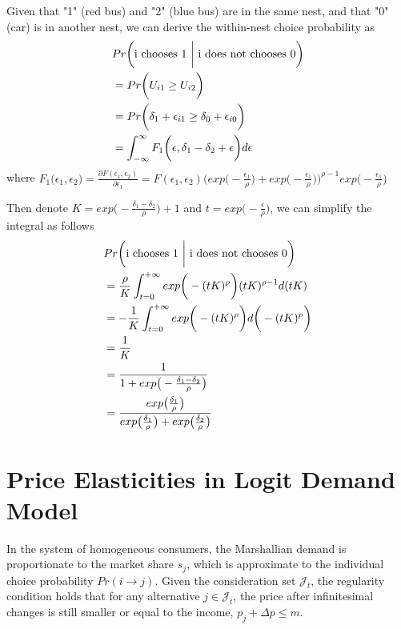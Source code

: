 \documentclass{article}
\begin{document}
Given that "1" (red bus) and "2" (blue bus) are in the same nest, and that "0" (car) is in another nest, we can derive the within-nest choice probability as 
\begin{equation}
\begin{split}
& Pr\bigg(\text{i chooses 1 \bigg| i does not chooses 0}\bigg) \\
& = Pr\bigg( U_{i1} \geq U_{i2} \bigg) \\
& = Pr\bigg(\delta_1 + \epsilon_{i1} \geq \delta_0 + \epsilon_{i0} \bigg) \\
& = \int_{-\infty}^{\infty} F_1\bigg( \epsilon, \delta_1 - \delta_2 + \epsilon \bigg) d\epsilon
\end{split}
\end{equation}
where $F_1\bigg( \epsilon_1, \epsilon_2 \bigg) = \frac{\partial F(\epsilon_1, \epsilon_2)}{\partial \epsilon_1} = F(\epsilon_1, \epsilon_2) \bigg( exp\big( -\frac{\epsilon_1}{\rho} \big) + exp\big( -\frac{\epsilon_1}{\rho} \big) \bigg)^{\rho -1} exp\bigg( -\frac{\epsilon_1}{\rho} \bigg) $

Then denote $K = exp\big( -\frac{\delta_1 - \delta_2}{\rho} \big) + 1$ and $t = exp\big( -\frac{\epsilon}{\rho} \big)$, we can simplify the integral as follows
\begin{equation}
\begin{split}
& Pr\bigg(\text{i chooses 1 \bigg| i does not chooses 0}\bigg) \\
& = \frac{\rho}{K} \int_{t = 0}^{+\infty} exp\bigg( -(tK)^{\rho} \bigg) (tK)^{\rho - 1} d(tK) \\
& = -\frac{1}{K} \int_{t = 0}^{+\infty} exp\bigg( -(tK)^{\rho} \bigg)  d\bigg( -(tK)^{\rho} \bigg) \\
& = \frac{1}{K} \\
& = \frac{1}{1 + exp\big( -\frac{\delta_1 - \delta_2}{\rho} \big) } \\
& = \frac{ exp\big( \frac{\delta_1}{\rho} \big) }{  exp\big( \frac{\delta_1}{\rho} \big) + exp\big( \frac{\delta_2}{\rho} \big) }
\end{split}
\end{equation}



\section{Price Elasticities in Logit Demand Model}
\addtolength{\jot}{-5pt}
In the system of homogeneous consumers, the Marshallian demand is proportionate to the market share $s_j$, which is approximate to the individual choice probability $Pr(i \rightarrow j)$. Given the consideration set $\mathcal{J}_t$, the regularity condition holds that for any alternative $j \in \mathcal{J}_t$, the price after infinitesimal changes is still smaller or equal to the income, $p_j + \Delta p \leq m$. 
\end{document}
